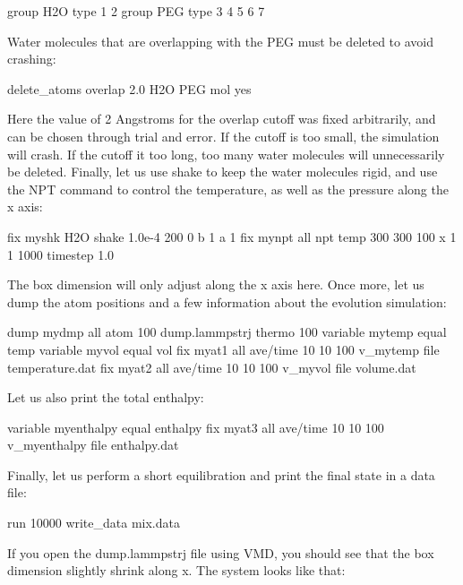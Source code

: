 \begin{lcverbatim}
group H2O type 1 2
group PEG type 3 4 5 6 7
\end{lcverbatim}

\noindent Water molecules that are overlapping with the PEG must be
deleted to avoid crashing:

\begin{lcverbatim}
delete_atoms overlap 2.0 H2O PEG mol yes
\end{lcverbatim}

\noindent Here the value of 2 Angstroms for the overlap cutoff was fixed arbitrarily,
and can be chosen through trial and error. If the cutoff is too small, the 
simulation will crash. If the cutoff it too long, too many water molecules will unnecessarily be deleted.
Finally, let us use shake to keep the water
molecules rigid, and use the NPT command to control the
temperature, as well as the pressure along the x axis:

\begin{lcverbatim}
fix myshk H2O shake 1.0e-4 200 0 b 1 a 1
fix mynpt all npt temp 300 300 100 x 1 1 1000
timestep 1.0
\end{lcverbatim}

\noindent The box dimension will only adjust along the x axis here.
Once more, let us dump the atom positions and a few
information about the evolution simulation:

\begin{lcverbatim}
dump mydmp all atom 100 dump.lammpstrj
thermo 100
variable mytemp equal temp
variable myvol equal vol
fix myat1 all ave/time 10 10 100 v_mytemp file temperature.dat
fix myat2 all ave/time 10 10 100 v_myvol file volume.dat
\end{lcverbatim}

\noindent Let us also print the total enthalpy:

\begin{lcverbatim}
variable myenthalpy equal enthalpy
fix myat3 all ave/time 10 10 100 v_myenthalpy file enthalpy.dat
\end{lcverbatim}

\noindent Finally, let us perform a short equilibration and print the
final state in a data file:

\begin{lcverbatim}
run 10000
write_data mix.data
\end{lcverbatim}

\noindent If you open the dump.lammpstrj file using VMD, you should
see that the box dimension slightly shrink along x.
The system looks like that:

